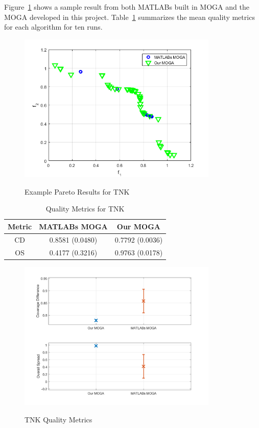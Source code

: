 \documentclass{article}
\begin{document}
\noindent Figure~\ref{fig:TNK} shows a sample result from both MATLABs built in MOGA and the MOGA developed in this project. Table~\ref{tab:TNK} summarizes the mean quality metrics for each algorithm for ten runs.
\begin{figure}[h]
  \caption{Example Pareto Results for TNK}
  \centering
  \includegraphics[width=0.85\textwidth]{TNK_pareto_final.png}  
  \label{fig:TNK}
\end{figure}

\begin{table}[H]
\caption{Quality Metrics for TNK} 
\centering 
\begin{tabular}{|c|c|c|} 
\hline\hline  
Metric & MATLABs MOGA & Our MOGA \\ \hline
CD &  0.8581 (0.0480) & 0.7792 (0.0036) \\ \hline
OS & 0.4177 (0.3216) & 0.9763 (0.0178)\\ \hline
\end{tabular}
\label{tab:TNK} 
\end{table}
\begin{figure}[H]
  \caption{TNK Quality Metrics}
  \centering
  \includegraphics[width=0.85\textwidth]{TNK_QM.png}  
  \label{fig:TNK_QM}
\end{figure}
 
\end{document}
